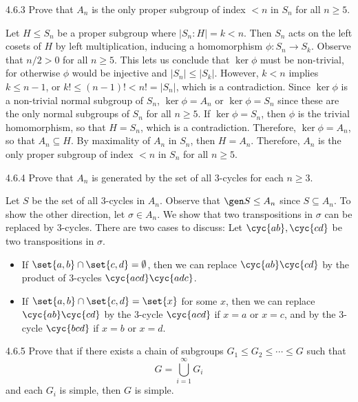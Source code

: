 \begin{exercise}{4.6.3}
	Prove that $A_n$ is the only proper subgroup of index $< n$ in $S_n$ for all $n \geq 5$.
\end{exercise}

\begin{sol}
	Let $H \leq S_n$ be a proper subgroup where $|S_n : H| = k < n$.
	Then $S_n$ acts on the left cosets of $H$ by left multiplication, inducing a homomorphism $\phi : S_n \to S_k$.
	Observe that $n/2 > 0$ for all $n \geq 5$.
	This lets us conclude that $\ker\phi$ must be non-trivial, for otherwise $\phi$ would be injective and $|S_n| \leq |S_k|$.
	However, $k < n$ implies $k \leq n - 1$, or $k! \leq (n - 1)! < n! = |S_n|$, which is a contradiction.
	Since $\ker\phi$ is a non-trivial normal subgroup of $S_n$, $\ker\phi = A_n$ or $\ker\phi = S_n$ since these are the only normal subgroups of $S_n$ for all $n \geq 5$.
	If $\ker\phi = S_n$, then $\phi$ is the trivial homomorphism, so that $H = S_n$, which is a contradiction.
	Therefore, $\ker\phi = A_n$, so that $A_n \subseteq H$.
	By maximality of $A_n$ in $S_n$, then $H = A_n$.
	Therefore, $A_n$ is the only proper subgroup of index $< n$ in $S_n$ for all $n \geq 5$.
\end{sol}

\begin{exercise}{4.6.4}
	Prove that $A_n$ is generated by the set of all 3-cycles for each $n \geq 3$.
\end{exercise}

\begin{sol}
	Let $S$ be the set of all 3-cycles in $A_n$.
	Observe that $\gen S \leq A_n$ since $S \subseteq A_n$.
	To show the other direction, let $\sigma \in A_n$.
	We show that two transpositions in $\sigma$ can be replaced by 3-cycles.
	There are two cases to discuss: Let $\cyc{a b}, \cyc{c d}$ be two transpositions in $\sigma$.
	\begin{itemize}
		\item If $\set{a, b} \cap \set{c, d} = \emptyset$, then we can replace $\cyc{a b}\cyc{c d}$ by the product of 3-cycles $\cyc{a c d}\cyc{a d c}$.
		\item If $\set{a, b} \cap \set{c, d} = \set{x}$ for some $x$, then we can replace $\cyc{a b}\cyc{c d}$ by the 3-cycle $\cyc{a c d}$ if $x = a$ or $x = c$, and by the 3-cycle $\cyc{b c d}$ if $x = b$ or $x = d$.
	\end{itemize}
\end{sol}

\begin{exercise}{4.6.5}
	Prove that if there exists a chain of subgroups $G_1 \leq G_2 \leq \cdots \leq G$ such that
	\[
		G = \bigcup_{i = 1}^\infty G_i
	\]
	and each $G_i$ is simple, then $G$ is simple.
\end{exercise}

